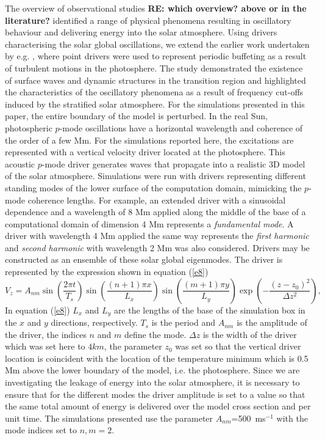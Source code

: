 \documentclass{aastex62}
\begin{document}
 The overview of observational studies {\bf RE: which overview? above or in the literature?} identified a range of physical phenomena resulting in oscillatory behaviour and delivering energy into the solar atmosphere.  Using drivers characterising the solar global oscillations, we extend the earlier work undertaken by e.g. \citet{Malins2007A}, where point drivers were used to represent periodic buffeting as a result of turbulent motions in the photosphere. The study demonstrated the existence of surface waves and dynamic structures in the transition region and highlighted the characteristics of the oscillatory phenomena as a result of frequency cut-offs induced by the stratified solar atmosphere. For the simulations presented in this paper, the entire boundary of the model is perturbed.  In the real Sun, photospheric $p$-mode oscillations have a horizontal wavelength and coherence of the order of a few Mm. For the simulations reported here, the excitations are represented with a vertical velocity driver located at the photosphere. This acoustic $p$-mode driver generates waves that propagate 
into a realistic 3D model of the solar atmosphere. Simulations were run with drivers representing different standing modes of the lower surface of the computation domain, mimicking the $p$-mode coherence lengths. For example, an extended driver with a sinusoidal dependence and a wavelength of 8 Mm applied along the 
middle of the base of a computational domain of dimension 4 Mm represents  a {\it fundamental mode}. 
A driver with wavelength 4 Mm applied the same way represents the {\it first harmonic} and {\it second harmonic} 
with wavelength 2 Mm was also considered. Drivers may be constructed as an ensemble of these solar 
global eigenmodes.  The driver is represented by the expression shown in equation (\ref{e8}) 
\begin{equation}
V_{z}=A_{nm} \sin\left(\frac{2\pi t}{T_s} \right)\sin\left(  \frac{(n+1)\pi x}{L_x} \right)  \sin\left(\frac{(m+1)\pi y}{L_y} \right)
\exp\left( -\frac{(z-z_0)^2}{\Delta z^2} \right),
\label{e8}
\end{equation}
In equation (\ref{e8}) $L_{x}$ and $L_{y}$ are the lengths of the base of the simulation box in the $x$ and $y$ directions, respectively. $T_{s}$ is the period and $A_{nm}$ is the amplitude of the driver, the indices $n$ and $m$ define the mode. $\Delta z$ is the width of the driver which was set here to $4km$, the parameter $z_{0}$ was set so that the vertical driver location is coincident with the location of the temperature minimum which is 0.5 Mm above the lower boundary of the model, i.e. the photosphere. Since we are investigating the leakage of energy into the solar atmosphere, it is necessary to ensure that for the different modes the driver amplitude is set to a value so that the same total amount of energy is delivered over the model cross section and per unit time. The simulations presented use the parameter $A_{nm}$=500\, ms$^{-1}$ with the mode indices set to $n,m=2$. 
\end{document}
